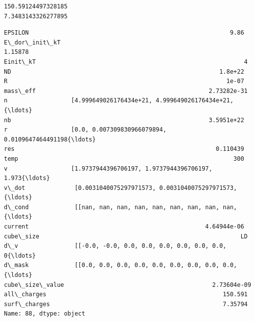 \documentclass[11pt]{article}
\makeatletter
\newcommand{\boxspacing}{\kern\kvtcb@left@rule\kern\kvtcb@boxsep}
\newcommand{\prompt}[4]{
        \ttfamily\llap{{\color{#2}[#3]:\hspace{3pt}#4}}\vspace{-\baselineskip}
    }
\makeatother
\begin{document}
    \begin{Verbatim}[commandchars=\\\{\}]
150.59124497328185
7.3483143326277895
    \end{Verbatim}

            \begin{tcolorbox}[breakable, size=fbox, boxrule=.5pt, pad at break*=1mm, opacityfill=0]
\prompt{Out}{outcolor}{187}{\boxspacing}
\begin{Verbatim}[commandchars=\\\{\}]
EPSILON                                                         9.86
E\_dor\_init\_kT                                                1.15878
Einit\_kT                                                           4
ND                                                           1.8e+22
R                                                              1e-07
mass\_eff                                                 2.73282e-31
n                  [4.999649026176434e+21, 4.999649026176434e+21,{\ldots}
nb                                                        3.5951e+22
r                  [0.0, 0.007309830966079894, 0.0109647464491198{\ldots}
res                                                         0.110439
temp                                                             300
v                  [1.9737944396706197, 1.9737944396706197, 1.973{\ldots}
v\_dot              [0.0031040075297971573, 0.0031040075297971573,{\ldots}
d\_cond             [[nan, nan, nan, nan, nan, nan, nan, nan, nan,{\ldots}
current                                                  4.64944e-06
cube\_size                                                         LD
d\_v                [[-0.0, -0.0, 0.0, 0.0, 0.0, 0.0, 0.0, 0.0, 0{\ldots}
d\_mask             [[0.0, 0.0, 0.0, 0.0, 0.0, 0.0, 0.0, 0.0, 0.0,{\ldots}
cube\_size\_value                                          2.73604e-09
all\_charges                                                  150.591
surf\_charges                                                 7.35794
Name: 88, dtype: object
\end{Verbatim}
\end{tcolorbox}
        
\end{document}

